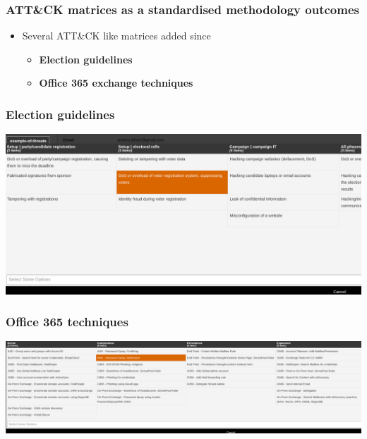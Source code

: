 \begin{frame}
  \frametitle{ATT\&CK matrices as a standardised methodology outcomes}
  \begin{itemize}
    \item Several ATT\&CK like matrices added since
    \begin{itemize}
      \item {\bf Election guidelines}
      \item {\bf Office 365 exchange techniques}
    \end{itemize}
  \end{itemize}
\end{frame}

\begin{frame}
  \frametitle{Election guidelines}
  \includegraphics[scale=0.3]{election.png}
\end{frame}

\begin{frame}
  \frametitle{Office 365 techniques}
  \includegraphics[scale=0.3]{office.png}
\end{frame}

